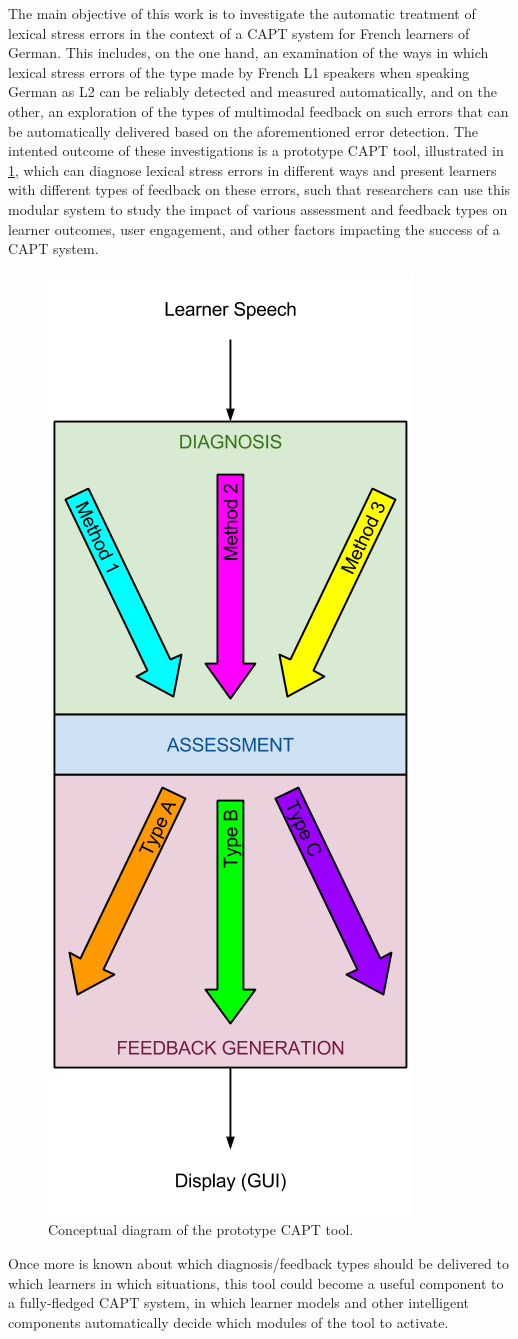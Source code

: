 The main objective of this work is to investigate the automatic treatment of lexical stress errors in the context of a CAPT system for French learners of German. This includes, on the one hand, an examination of the ways in which lexical stress errors of the type made by French L1 speakers when speaking German as L2 can be reliably detected and measured %
automatically, and on the other, an exploration of the types of multimodal feedback on such errors that can be automatically delivered based on the aforementioned error detection. 
The intented outcome of these investigations is a prototype CAPT tool, illustrated in \ref{fig:hourglass}, which can diagnose lexical stress errors in different ways and present learners with different types of feedback on these errors, such that researchers can use this modular system to study the impact of various assessment and feedback types on learner outcomes, user engagement, and other factors impacting the success of a CAPT system. 

		\begin{figure}[htb]
			\centering
			\includegraphics[width=.3\textwidth]{../img/hourglass}
			\caption{Conceptual diagram of the prototype CAPT tool.}
			\label{fig:hourglass}
		\end{figure}

Once more is known about which diagnosis/feedback types should be delivered to which learners in which situations, this tool could become a useful component to a fully-fledged CAPT system, in which learner models and other intelligent components automatically decide which modules of the tool to activate. %

